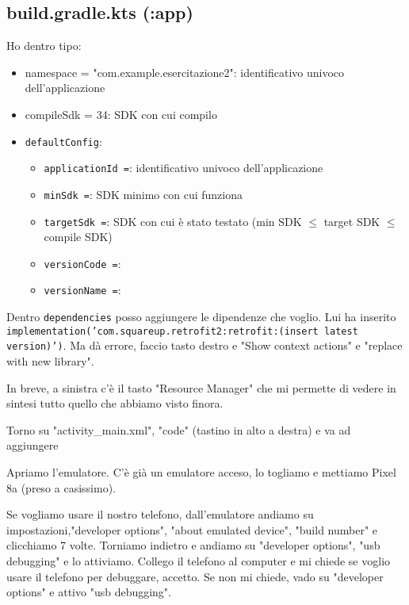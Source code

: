 \subsection{build.gradle.kts (:app)}
\par Ho dentro tipo:
\begin{itemize}
    \item namespace = "com.example.esercitazione2": identificativo univoco dell'applicazione
    \item compileSdk = 34: SDK con cui compilo
    \item \texttt{defaultConfig}: 
    \begin{itemize}
        \item \texttt{applicationId =}: identificativo univoco dell'applicazione
        \item \texttt{minSdk =}: SDK minimo con cui funziona
        \item \texttt{targetSdk =}: SDK con cui è stato testato (min SDK $\leq$ target SDK $\leq$ compile SDK)
        \item \texttt{versionCode =}: 
        \item \texttt{versionName =}:
    \end{itemize}
\end{itemize}
\par Dentro \texttt{dependencies} posso aggiungere le dipendenze che voglio. Lui ha inserito \texttt{implementation('com.squareup.retrofit2:retrofit:(insert latest version)')}. Ma dà errore, faccio tasto destro e "Show context actions" e "replace with new library".
\par In breve, a sinistra c'è il tasto "Resource Manager" che mi permette di vedere in sintesi tutto quello che abbiamo visto finora.

\par Torno su "activity\_main.xml", "code" (tastino in alto a destra) e va ad aggiungere 

\par Apriamo l'emulatore. C'è già un emulatore acceso, lo togliamo e mettiamo Pixel 8a (preso a casissimo).
\par Se vogliamo usare il nostro telefono, dall'emulatore andiamo su impostazioni,"developer options", "about emulated device", "build number" e clicchiamo 7 volte. Torniamo indietro e andiamo su "developer options", "usb debugging" e lo attiviamo. Collego il telefono al computer e mi chiede se voglio usare il telefono per debuggare, accetto. Se non mi chiede, vado su "developer options" e attivo "usb debugging".

